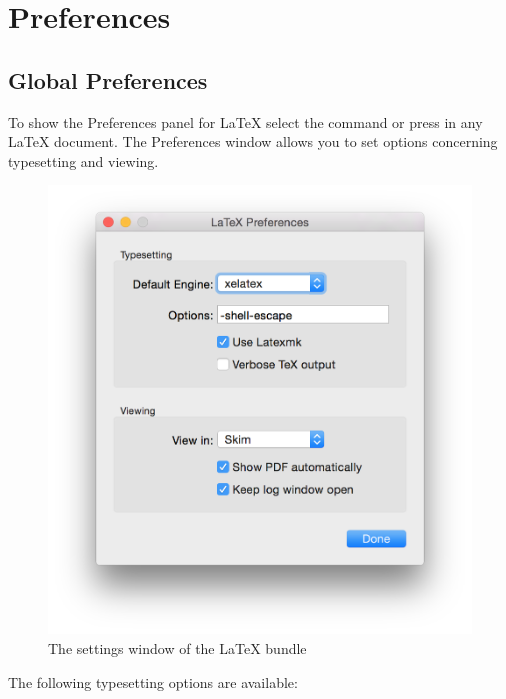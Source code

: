 \documentclass[11pt, x11names]{article}
\begin{document}
\section{Preferences}
\label{sec:preferences}

\subsection{Global Preferences}

To show the Preferences panel for LaTeX select the command  or press \keys{\Alt + \cmd + ,} in any LaTeX document. The Preferences window allows you to set options concerning typesetting and viewing.

\begin{figure}[h]
  \centering
    \includegraphics[width=.8\textwidth]{Figures/Preferences}
  \caption{The settings window of the LaTeX bundle}
  \label{fig:Figures_Preferences}
\end{figure}

The following typesetting options are available:
\end{document}
